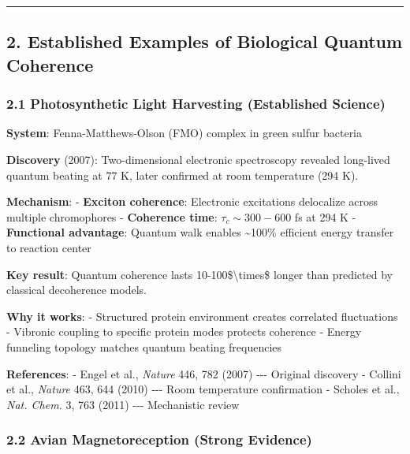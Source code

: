 \begin{center}\rule{0.5\linewidth}{0.5pt}\end{center}

\subsection{2. Established Examples of Biological Quantum
Coherence}\label{established-examples-of-biological-quantum-coherence}

\subsubsection{\texorpdfstring{2.1 Photosynthetic Light Harvesting
(Established
Science)}{2.1 Photosynthetic Light Harvesting  (Established Science)}}\label{photosynthetic-light-harvesting-established-science}

\textbf{System}: Fenna-Matthews-Olson (FMO) complex in green sulfur
bacteria

\textbf{Discovery} (2007): Two-dimensional electronic spectroscopy
revealed long-lived quantum beating at 77 K, later confirmed at room
temperature (294 K).

\textbf{Mechanism}: - \textbf{Exciton coherence}: Electronic excitations
delocalize across multiple chromophores - \textbf{Coherence time}:
\(\tau_c \sim 300-600\) fs at 294 K - \textbf{Functional advantage}:
Quantum walk enables \textasciitilde100\% efficient energy transfer to
reaction center

\textbf{Key result}: Quantum coherence lasts
10-100\$\textbackslash times\$ longer than predicted by classical
decoherence models.

\textbf{Why it works}: - Structured protein environment creates
correlated fluctuations - Vibronic coupling to specific protein modes
protects coherence - Energy funneling topology matches quantum beating
frequencies

\textbf{References}: - Engel et al., \emph{Nature} 446, 782 (2007)
-\/-\/- Original discovery - Collini et al., \emph{Nature} 463, 644
(2010) -\/-\/- Room temperature confirmation - Scholes et al.,
\emph{Nat. Chem.} 3, 763 (2011) -\/-\/- Mechanistic review

\subsubsection{\texorpdfstring{2.2 Avian Magnetoreception (Strong
Evidence)}{2.2 Avian Magnetoreception  (Strong Evidence)}}\label{avian-magnetoreception-strong-evidence}


